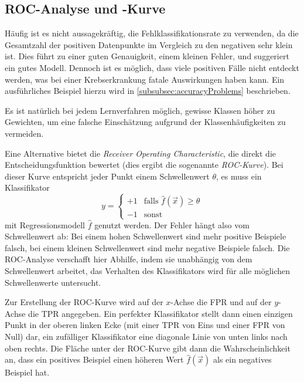 		\subsection{ROC-Analyse und -Kurve}
			Häufig ist es nicht aussagekräftig, die Fehlklassifikationsrate zu verwenden, da die Gesamtzahl der positiven Datenpunkte im Vergleich zu den negativen sehr klein ist. Dies führt zu einer guten Genauigkeit, \bzw einem kleinen Fehler, und suggeriert ein gutes Modell. Dennoch ist es möglich, dass viele positiven Fälle nicht entdeckt werden, was \bspw bei einer Krebserkrankung fatale Auswirkungen haben kann. Ein ausführliches Beispiel hierzu wird in \autoref{subsubsec:accuracyProblems} beschrieben.

			Es ist natürlich bei jedem Lernverfahren möglich, gewisse Klassen höher zu Gewichten, um eine falsche Einschätzung aufgrund der Klassenhäufigkeiten zu vermeiden.

			Eine Alternative bietet die \emph{Receiver Operating Characteristic}, die direkt die Entscheidungsfunktion bewertet (dies ergibt die sogenannte \emph{ROC-Kurve}). Bei dieser Kurve entspricht jeder Punkt einem Schwellenwert \(\theta\), \dh es muss ein Klassifikator
			\begin{equation}
				y =
					\begin{cases}
						+1 & \text{falls } \hat{f}(\vec{x}) \geq \theta \\
						-1 & \text{sonst}
					\end{cases}
			\end{equation}
			mit Regressionsmodell \(\hat{f}\) genutzt werden. Der Fehler hängt also vom Schwellenwert ab: Bei einem hohen Schwellenwert sind mehr positive Beispiele falsch, bei einem kleinen Schwellenwert sind mehr negative Beispiele falsch. Die ROC-Analyse verschafft hier Abhilfe, indem sie unabhängig von dem Schwellenwert arbeitet, \dh das Verhalten des Klassifikators wird für alle möglichen Schwellenwerte untersucht.

			Zur Erstellung der ROC-Kurve wird auf der \(x\)-Achse die FPR und auf der \(y\)-Achse die TPR angegeben. Ein perfekter Klassifikator stellt dann einen einzigen Punkt in der oberen linken Ecke (mit einer TPR von Eins und einer FPR von Null) dar, ein zufälliger Klassifikator eine diagonale Linie von unten links nach oben rechts. Die Fläche unter der ROC-Kurve gibt dann die Wahrscheinlichkeit an, dass ein positives Beispiel einen höheren Wert \(\hat{f}(\vec{x})\) als ein negatives Beispiel hat.


